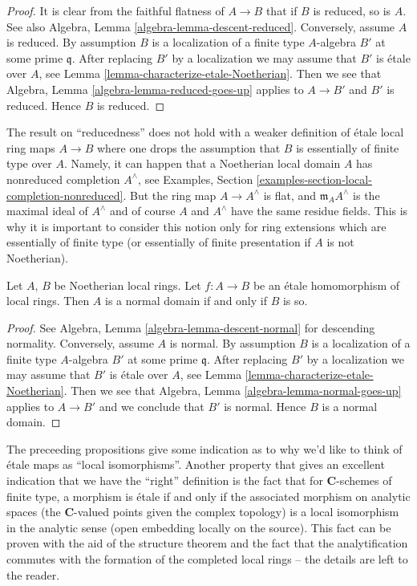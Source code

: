 \begin{proof}
It is clear from the faithful flatness of $A \to B$ that if $B$ is reduced, so
is $A$. See also Algebra, Lemma \ref{algebra-lemma-descent-reduced}.
Conversely, assume $A$ is reduced. By assumption $B$ is a localization
of a finite type $A$-algebra $B'$ at some prime $\mathfrak q$.
After replacing $B'$ by a localization we may assume that $B'$
is \'etale over $A$, see Lemma \ref{lemma-characterize-etale-Noetherian}.
Then we see that Algebra, Lemma \ref{algebra-lemma-reduced-goes-up} applies to
$A \to B'$ and $B'$ is reduced. Hence $B$ is reduced.
\end{proof}

\begin{remark}
\label{remark-technicality-needed}
The result on ``reducedness'' does not hold with a weaker
definition of \'etale local ring maps $A \to B$ where one
drops the assumption that $B$ is essentially of finite type over $A$.
Namely, it can happen that a Noetherian local domain $A$ has nonreduced
completion $A^\wedge$, see
Examples, Section \ref{examples-section-local-completion-nonreduced}.
But the ring map $A \to A^\wedge$ is flat, and $\mathfrak m_AA^\wedge$
is the maximal ideal of $A^\wedge$ and of course $A$ and $A^\wedge$ have
the same residue fields. This is why it is important to consider
this notion only for ring extensions which are essentially of finite type
(or essentially of finite presentation if $A$ is not Noetherian).
\end{remark}

\begin{proposition}
\label{proposition-etale-normal}
Let $A$, $B$ be Noetherian local rings.
Let $f : A \to B$ be an \'etale homomorphism of local rings.
Then $A$ is a normal domain if and only if $B$ is so.
\end{proposition}

\begin{proof}
See
Algebra, Lemma \ref{algebra-lemma-descent-normal}
for descending normality. Conversely, assume $A$ is normal.
By assumption $B$ is a localization of a finite type $A$-algebra
$B'$ at some prime $\mathfrak q$. After replacing $B'$ by a localization
we may assume that $B'$ is \'etale over $A$, see
Lemma \ref{lemma-characterize-etale-Noetherian}.
Then we see that
Algebra, Lemma \ref{algebra-lemma-normal-goes-up}
applies to $A \to B'$ and we conclude that $B'$ is normal.
Hence $B$ is a normal domain.
\end{proof}

\noindent
The preceeding propositions give some indication as to why we'd like to think
of \'etale maps as ``local isomorphisms''. Another property that gives an
excellent indication that we have the ``right'' definition is the fact that
for $\mathbf{C}$-schemes of finite type, a morphism is \'etale if and only if
the associated morphism on analytic spaces (the $\mathbf{C}$-valued points given
the complex topology) is a local isomorphism in the analytic sense (open
embedding locally on the source). This fact can be proven with the aid of the
structure theorem and the fact that the analytification commutes with the
formation of the completed local rings -- the details are left to the reader.









